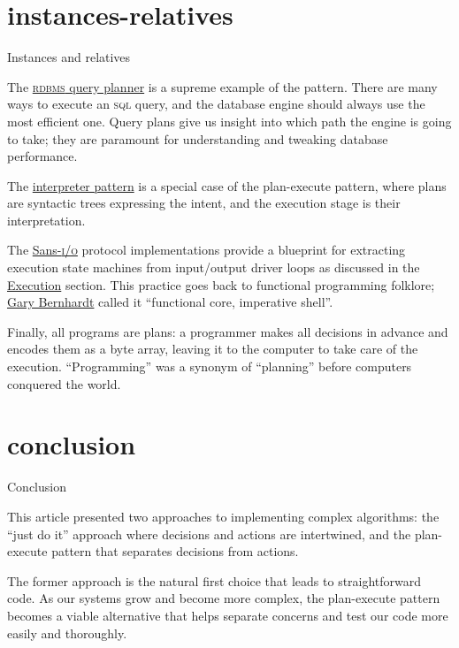\documentclass{article}
\begin{document}
\section{instances-relatives}{Instances and relatives}

The \href{https://en.wikipedia.org/wiki/Query_plan}{\textsc{rdbms} query planner} is a supreme example of the pattern.
There are many ways to execute an \textsc{sql} query, and the database engine should always use the most efficient one.
Query plans give us insight into which path the engine is going to take; they are paramount for understanding and tweaking database performance.

The \href{https://en.wikipedia.org/wiki/Interpreter_pattern}{interpreter pattern} is a special case of the plan-execute pattern,
where plans are syntactic trees expressing the intent,
and the execution stage is their interpretation.

The \href{https://sans-io.readthedocs.io/how-to-sans-io.html}{Sans-\textsc{i/o}} protocol implementations provide a blueprint for extracting execution state machines from input/output driver loops
as discussed in the \href{#execution}{Execution} section.
This practice goes back to functional programming folklore;
\href{https://www.destroyallsoftware.com/talks/boundaries}{Gary Bernhardt} called it ``functional core, imperative shell''.

Finally, all programs are plans: a programmer makes all decisions in advance and encodes them as a byte array,
leaving it to the computer to take care of the execution.
``Programming'' was a synonym of ``planning'' before computers conquered the world.

\section{conclusion}{Conclusion}

This article presented two approaches to implementing complex algorithms:
the ``just do it'' approach where decisions and actions are intertwined,
and the plan-execute pattern that separates decisions from actions.

The former approach is the natural first choice that leads to straightforward code.
As our systems grow and become more complex,
the plan-execute pattern becomes a viable alternative that helps separate concerns and test our code more easily and thoroughly.
\end{document}
